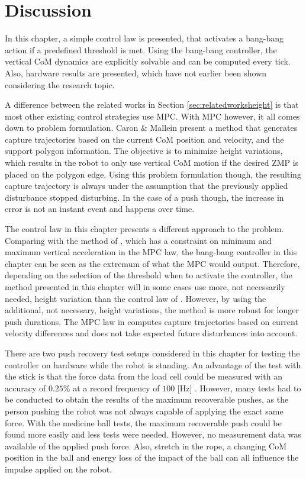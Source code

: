 \section{Discussion}
In this chapter, a simple control law is presented, that activates a bang-bang action if a predefined threshold is met. Using the bang-bang controller, the vertical \ac{CoM} dynamics are explicitly solvable and can be computed every tick. Also, hardware results are presented, which have not earlier been shown considering the research topic. 

A difference between the related works in Section \ref{sec:relatedworksheight} is that most other existing control strategies use \ac{MPC}. With \ac{MPC} however, it all comes down to problem formulation. Caron \& Mallein \cite{caron2018balance} present a method that generates capture trajectories based on the current \ac{CoM} position and velocity, and the support polygon information. The objective is to minimize height variations, which results in the robot to only use vertical \ac{CoM} motion if the desired \ac{ZMP} is placed on the polygon edge. Using this problem formulation though, the resulting capture trajectory is always under the assumption that the previously applied disturbance stopped disturbing. In the case of a push though, the increase in error is not an instant event and happens over time.

The control law in this chapter presents a different approach to the problem. Comparing with the method of \cite{caron2018balance}, which has a constraint on minimum and maximum vertical acceleration in the \ac{MPC} law, the bang-bang controller in this chapter can be seen as the extremum of what the \ac{MPC} would output. Therefore, depending on the selection of the threshold when to activate the controller, the method presented in this chapter will in some cases use more, not necessarily needed, height variation than the control law of \cite{caron2018balance}. However, by using the additional, not necessary, height variations, the method is more robust for longer push durations. The \ac{MPC} law in \cite{caron2018balance} computes capture trajectories based on current velocity differences and does not take expected future disturbances into account.

There are two push recovery test setups considered in this chapter for testing the controller on hardware while the robot is standing. An advantage of the test with the stick is that the force data from the load cell could be measured with an accuracy of $0.25$\% at a record frequency of $100$ [Hz] \cite{iload}. However, many tests had to be conducted to obtain the results of the maximum recoverable pushes, as the person pushing the robot was not always capable of applying the exact same force. With the medicine ball tests, the maximum recoverable push could be found more easily and less tests were needed. However, no measurement data was available of the applied push force. Also, stretch in the rope, a changing \ac{CoM} position in the ball and energy loss of the impact of the ball can all influence the impulse applied on the robot.

